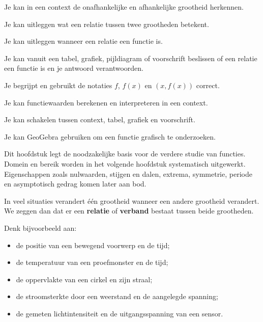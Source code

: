 \documentclass{ximera}
\begin{document}
\begin{leerdoelen}
    \item Je kan in een context de onafhankelijke en afhankelijke grootheid herkennen.
    \item Je kan uitleggen wat een relatie tussen twee grootheden betekent.
    \item Je kan uitleggen wanneer een relatie een functie is.
    \item Je kan vanuit een tabel, grafiek, pijldiagram of voorschrift beslissen
          of een relatie een functie is en je antwoord verantwoorden.
    \item Je begrijpt en gebruikt de notaties \(f\), \(f(x)\) en \((x,f(x))\) correct.
    \item Je kan functiewaarden berekenen en interpreteren in een context.
    \item Je kan schakelen tussen context, tabel, grafiek en voorschrift.
    \item Je kan GeoGebra gebruiken om een functie grafisch te onderzoeken.
\end{leerdoelen}

\begin{opmerking}
Dit hoofdstuk legt de noodzakelijke basis voor de verdere studie van functies.
Domein en bereik worden in het volgende hoofdstuk systematisch uitgewerkt.
Eigenschappen zoals nulwaarden, stijgen en dalen, extrema, symmetrie, periode
en asymptotisch gedrag komen later aan bod.
\end{opmerking}



In veel situaties verandert één grootheid wanneer een andere grootheid verandert.
We zeggen dan dat er een \textbf{relatie} of \textbf{verband} bestaat tussen
beide grootheden.

Denk bijvoorbeeld aan:

\begin{itemize}
    \item de positie van een bewegend voorwerp en de tijd;
    \item de temperatuur van een proefmonster en de tijd;
    \item de oppervlakte van een cirkel en zijn straal;
    \item de stroomsterkte door een weerstand en de aangelegde spanning;
    \item de gemeten lichtintensiteit en de uitgangsspanning van een sensor.
\end{itemize}
\end{document}
